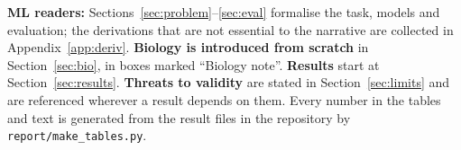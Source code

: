 \begin{keybox}
\textbf{ML readers:} Sections~\ref{sec:problem}--\ref{sec:eval} formalise the task, models and evaluation; the derivations that are not essential to the narrative are collected in Appendix~\ref{app:deriv}. \textbf{Biology is introduced from scratch} in Section~\ref{sec:bio}, in boxes marked ``Biology note''. \textbf{Results} start at Section~\ref{sec:results}. \textbf{Threats to validity} are stated in Section~\ref{sec:limits} and are referenced wherever a result depends on them. Every number in the tables and text is generated from the result files in the repository by \texttt{report/make\_tables.py}.
\end{keybox}
\tableofcontents
\clearpage
